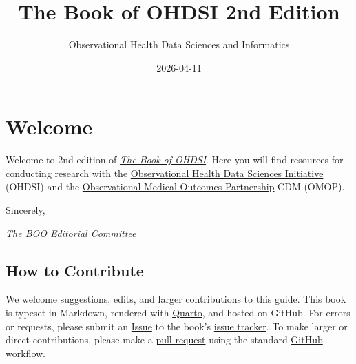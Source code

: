 \documentclass[
  letterpaper,
  paper=7in:10in,
  pagesize=pdftex,
  headinclude=on,
  footinclude=on,
  12pt]{scrbook}
\title{The Book of OHDSI 2nd Edition}
\subtitle{Observational Health Data Sciences and Informatics}
\author{}
\date{2026-04-11}
\renewcommand*\contentsname{Table of contents}
\newcommand\contentsname{Table of contents}
\begin{document}
\frontmatter
\maketitle


\renewcommand*\contentsname{Table of contents}
{
\setcounter{tocdepth}{2}
\tableofcontents
}

\mainmatter
{}

\chapter*{Welcome}\label{sec-welcome}


Welcome to 2nd edition of
\href{https://ohdsi.github.io/BookOfOhdsi-2ndEdition/}{\emph{The Book of
OHDSI}}. Here you will find resources for conducting research with the
\href{https://ohdsi.org/}{Observational Health Data Sciences Initiative}
(OHDSI) and the
\href{https://www.ohdsi.org/data-standardization/}{Observational Medical
Outcomes Partnership} CDM (OMOP).

Sincerely,

\emph{The BOO Editorial Committee}

\section*{How to Contribute}\label{sec-welcome-contribute}


We welcome suggestions, edits, and larger contributions to this guide.
This book is typeset in Markdown, rendered with
\href{https://quarto.org/}{Quarto}, and hosted on GitHub. For errors or
requests, please submit an
\href{https://docs.github.com/en/issues/tracking-your-work-with-issues/about-issues}{Issue}
to the book's
\href{https://github.com/OHDSI/BookOfOhdsi-2ndEdition/issues}{issue
tracker}. To make larger or direct contributions, please make a
\href{https://github.com/OHDSI/BookOfOhdsi-2ndEdition/pulls}{pull
request} using the standard
\href{https://docs.github.com/en/get-started/quickstart/contributing-to-projects}{GitHub
workflow}.
\end{document}
